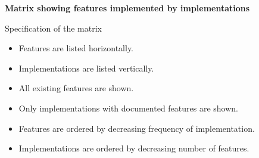 \documentclass{article}
\newcommand{\flip}[1]{\begin{sideways}#1\end{sideways}}
\newcommand{\baseuri}{http://101companies.uni-koblenz.de/index.php}
\newcommand{\hLegend}[1]{#1}
\newcommand{\vLegend}[1]{#1}
\begin{document}
{


\renewcommand{\hLegend}[1]{\flip{\textbf{\href{\baseuri/101feature:#1}{#1}}}}
\renewcommand{\vLegend}[1]{\textbf{\href{\baseuri/101implementation:#1}{#1}}}

\noindent
\begin{boxedminipage}{\hsize}
\begin{center}
\bigskip

\bigskip
\end{center}
\end{boxedminipage}

}

\begin{center}
\textbf{Matrix showing features implemented by implementations}
\end{center}

\bigskip

\bigskip

\noindent
Specification of the matrix

\noindent
\begin{itemize}
\item Features are listed horizontally.
\item Implementations are listed vertically.
\item All existing features are shown.
\item Only implementations with documented features are shown.
\item Features are ordered by decreasing frequency of implementation.
\item Implementations are ordered by decreasing number of features.
\end{itemize}
\end{document}
